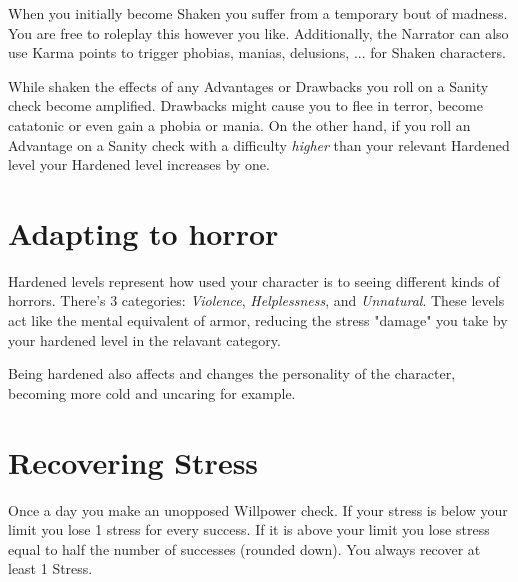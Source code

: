 When you initially become Shaken you suffer from a temporary bout of madness. 
You are free to roleplay this however you like. 
Additionally, the Narrator can also use Karma points to trigger 
phobias, manias, delusions, ... for Shaken characters.


While shaken the effects of any Advantages or Drawbacks you roll on a Sanity check become amplified.
Drawbacks might cause you to flee in terror, become catatonic or even gain a phobia or mania.
On the other hand, if you roll an Advantage on a Sanity check with a difficulty \textit{higher}
than your relevant Hardened level your Hardened level increases by one.




\section{Adapting to horror}

Hardened levels represent how used your character is to seeing different kinds of horrors.
There's 3 categories: \textit{Violence}, \textit{Helplessness}, and \textit{Unnatural}.
These levels act like the mental equivalent of armor, reducing the stress "damage" 
you take by your hardened level in the relavant category.

Being hardened also affects and changes the personality of the character, becoming more cold and uncaring for example.


\section{Recovering Stress}
Once a day you make an unopposed Willpower check. 
If your stress is below your limit you lose 1 stress for every success. 
If it is above your limit you lose stress equal to half the number of successes (rounded down).
You always recover at least 1 Stress.

